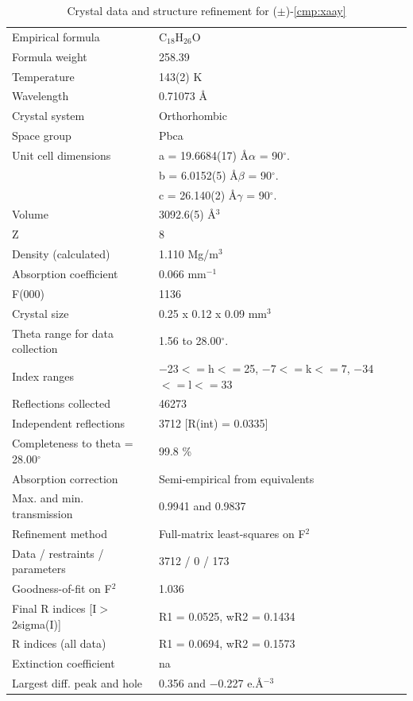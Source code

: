 \pagebreak
\begin{table}[h]
\centering
\caption{Crystal data and structure refinement for ($\pm$)-\ref{cmp:xaay}} 
\begin{tabular}{ll} 
\toprule
Empirical formula& 	C$_{18}$H$_{26}$O \\
Formula weight&	258.39 \\
Temperature &	143(2) K \\
Wavelength& 	0.71073 \AA  \\
Crystal system& 	Orthorhombic \\
Space group& 	Pbca \\
Unit cell dimensions&	a = 19.6684(17) \AA	$\alpha$ = 90$^\circ$. \\
	&b = 6.0152(5) \AA	$\beta$ = 90$^\circ$. \\
	&c = 26.140(2) \AA	$\gamma$ = 90$^\circ$. \\
Volume&	3092.6(5) \AA$^3$ \\
Z&	8 \\
Density (calculated)&	1.110 Mg/m$^3$ \\
Absorption coefficient&	0.066 mm$^{-1}$ \\
F(000) &	1136 \\
Crystal size &	0.25 x 0.12 x 0.09 mm$^3$ \\
Theta range for data collection &	1.56 to 28.00$^\circ$. \\
Index ranges &	$-$23$<=$h$<=$25, $-$7$<=$k$<=$7, $-$34$<=$l$<=$33 \\
Reflections collected &	46273 \\
Independent reflections &	3712 [R(int) = 0.0335] \\
Completeness to theta = 28.00$^\circ$ &	99.8 \% \\ 
Absorption correction&	Semi-empirical from equivalents \\
Max. and min. transmission &	0.9941 and 0.9837 \\
Refinement method	&Full-matrix least-squares on F$^2$ \\
Data / restraints / parameters &	 3712 / 0 / 173 \\
Goodness-of-fit on F$^2$ & 	1.036 \\
Final R indices [I$>$2sigma(I)] &	R1 = 0.0525, wR2 = 0.1434 \\
R indices (all data) &	R1 = 0.0694, wR2 = 0.1573 \\
Extinction coefficient	& na \\
Largest diff. peak and hole &	0.356 and $-$0.227 e.\AA$^{-3}$ \\
\bottomrule
\end{tabular}
\end{table}
\pagebreak


